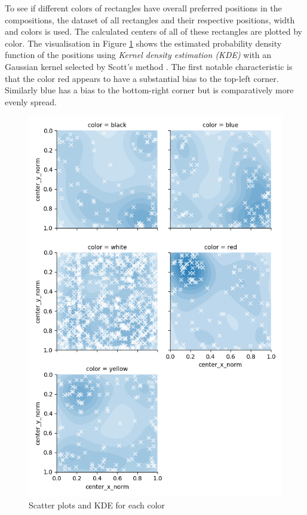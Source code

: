 \documentclass[serif,article,noparskip]{agse-thesis}
\begin{document}
To see if different colors of rectangles have overall preferred positions in the
compositions, the dataset of all rectangles and their respective positions, width
and colors is used. The calculated centers of all of these rectangles are
plotted by color. The visualisation in Figure \ref{fig:kde} shows the estimated
probability density function of the positions using \textit{Kernel density
estimation (KDE)} with an Gaussian kernel selected by Scott's method
\cite{Terrell1992}. The first notable characteristic is that the color red
appears to have a substantial bias to the top-left corner. Similarly blue has a
bias to the bottom-right corner but is comparatively more evenly spread.


\begin{figure}
\includegraphics[width=\linewidth]{images/kernel-densities.png}
\caption{Scatter plots and KDE for each color}
\label{fig:kde}
\end{figure}
\end{document}
